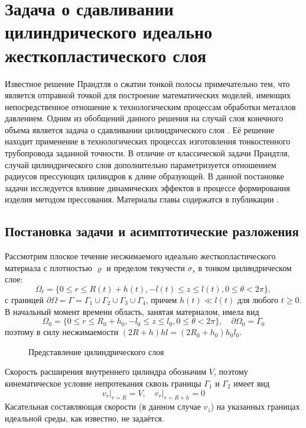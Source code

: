 \chapter{Задача о сдавливании цилиндрического идеально жесткопластического слоя}\label{ch:ch2}
Известное решение Прандтля \autocite{Prandtl:1948} о сжатии тонкой полосы примечательно тем, что является отправной точкой для построение математических моделей, имеющих непосредственное отношение к технологическим процессам обработки металлов давлением. Одним из обобщений данного решения на случай слоя конечного объема является задача о сдавливании цилиндрического слоя \autocite{Georgievsky:2010}. Её решение находит применение в технологических процессах изготовления тонкостенного трубопровода заданной точности. В отличие от классической задачи Прандтля, случай цилиндрического слоя дополнительно параметризуется отношением радиусов прессующих цилиндров к длине образующей. В данной постановке задачи исследуется влияние динамических эффектов в процессе формирования изделия методом прессования. Материалы главы содержатся в публикации \autocite{Shabaykin:2020b}.

\section{Постановка задачи и асимптотические разложения}\label{sec:ch2/sec1}

Рассмотрим плоское течение несжимаемого идеально жесткопластического материала с плотностью $\varrho$ и пределом текучести $\sigma_{s}$ в тонком цилиндрическом слое:
\begin{equation}
  \Omega_{t} = \{0 \le r \le R(t) + h(t), -l(t) \le z \le l(t), 0 \le \theta < 2\pi\},
\end{equation}
с границей $\partial\Omega = \Gamma = \Gamma_{1} \cup \Gamma_{2} \cup \Gamma_{3}\cup \Gamma_{4}$, причем $h(t) \ll l(t)$ для любого $t \ge 0$. В начальный момент времени область, занятая материалом, имела вид
\begin{equation}
  \Omega_{0} = \{0 \le r \le R_{0} + h_{0}, -l_{0} \le z \le l_{0}, 0 \le \theta < 2\pi\}, \quad \partial\Omega_{0} = \Gamma_{0}
\end{equation}
поэтому в силу несжимаемости $(2R+h)hl=(2R_{0}+h_{0})h_{0}l_{0}$.

\begin{figure}[ht]
  \caption{Представление цилиндрического слоя}
  \label{fig:ch2/layer}
\end{figure}
Скорость расширения внутреннего цилиндра обозначим $V$, поэтому кинематическое условие непротекания сквозь границы $\Gamma_{1}$ и $\Gamma_{2}$ имеет вид
\begin{equation}
  \label{eq:ch2/sec1/boundary/kinematic}
  v_{r}\lvert_{r=R} = V, \quad v_{r}\lvert_{r=R+h} = 0
\end{equation}
Касательная составляющая скорости (в данном случае $v_{z}$) на указанных границах идеальной среды, как известно, не задаётся.

